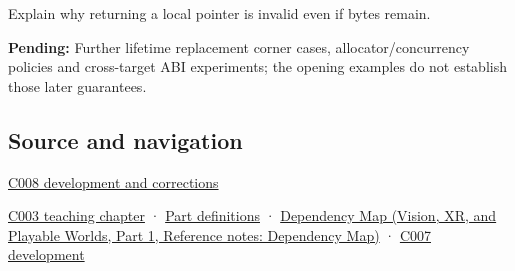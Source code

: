 \hypertarget{appendix-0b104bcba06b-recall-and-next-depth}{}

Explain why returning a local pointer is invalid even if bytes remain.

\textbf{Pending:} Further lifetime replacement corner cases, allocator/concurrency policies and cross-target ABI experiments; the opening examples do not establish those later guarantees.

\subsection{Source and navigation}\label{appendix-0b104bcba06b-source-and-navigation}

\hypertarget{appendix-0b104bcba06b-source-and-navigation}{}

\hyperref[appendix-fd090d982a15-m008---parts-113-126]{C008 development and corrections}

\hyperref[01-foundations-i-ch002-where-the-bytes-live]{C003 teaching chapter} · \hyperref[appendix-fd090d982a15-m003---parts-41-60]{Part definitions} · \href{../07-Vision-XR-and-Playable-Worlds-P01/main.pdf\#appendix-4ad47bdd269a}{Dependency Map (Vision, XR, and Playable Worlds, Part 1, Reference notes: Dependency Map)} · \hyperref[01-foundations-i-ch002-storage-is-a-place-an-object-is-its-occupant]{C007 development}
